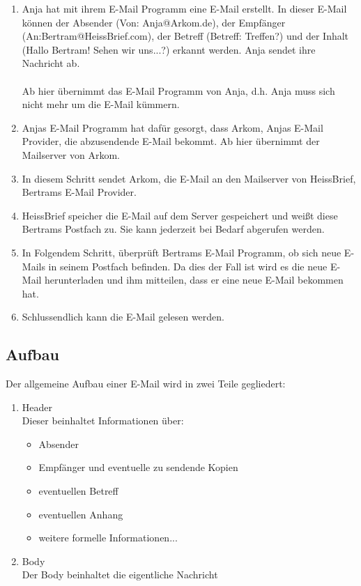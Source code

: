 \documentclass[12pt,a4paper]{report}
\begin{document}
\begin{onehalfspace}
\begin{enumerate}
\item Anja hat mit ihrem E-Mail Programm eine E-Mail erstellt. In dieser E-Mail können der Absender (Von: Anja@Arkom.de), der Empfänger (An:Bertram@HeissBrief.com), der Betreff (Betreff: Treffen?) und der Inhalt (Hallo Bertram! Sehen wir uns...?) erkannt werden. Anja sendet ihre Nachricht ab.\\\\
Ab hier übernimmt das E-Mail Programm von Anja, d.h. Anja muss sich nicht mehr um die E-Mail kümmern.
\item Anjas E-Mail Programm hat dafür gesorgt, dass Arkom,  Anjas E-Mail Provider, die abzusendende E-Mail bekommt. Ab hier übernimmt der Mailserver von Arkom.
\item In diesem Schritt sendet Arkom, die E-Mail an den Mailserver von HeissBrief, Bertrams E-Mail Provider.
\item HeissBrief speicher die E-Mail auf dem Server gespeichert und weißt diese Bertrams Postfach zu. Sie kann jederzeit bei Bedarf abgerufen werden.
\item In Folgendem Schritt, überprüft Bertrams E-Mail Programm, ob sich neue E-Mails in seinem Postfach befinden. Da dies der Fall ist wird es die neue E-Mail herunterladen und ihm mitteilen, dass er eine neue E-Mail bekommen hat.
\item Schlussendlich kann die E-Mail gelesen werden.
\end{enumerate} 

\subsection{Aufbau}
Der allgemeine Aufbau einer E-Mail wird in zwei Teile gegliedert:
\begin{enumerate}
\item Header\\
Dieser beinhaltet Informationen über:
\begin{itemize}
\item Absender
\item Empfänger und eventuelle zu sendende Kopien
\item eventuellen Betreff
\item eventuellen Anhang
\item weitere formelle Informationen...
\end{itemize}
\item Body\\
Der Body beinhaltet die eigentliche Nachricht
\end{enumerate} 

\end{onehalfspace}
\end{document}
